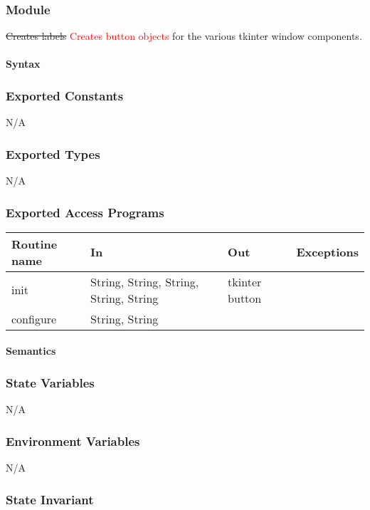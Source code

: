 \documentclass[12pt]{article}
\begin{document}
\subsubsection*{Module}

\sout{Creates labels} \textcolor{red}{Creates button objects} for the various tkinter window components.

\paragraph*{Syntax}

\subsubsection*{Exported Constants}
N/A
\subsubsection*{Exported Types}

N/A

\subsubsection* {Exported Access Programs}

\begin{tabular}{| l | l | l | l |}
\hline
\textbf{Routine name} & \textbf{In} & \textbf{Out} & \textbf{Exceptions}\\
\hline
init & String, String, String, String, String & tkinter button & \\
\hline
configure & String, String & & \\
\hline
\end{tabular}

\paragraph* {Semantics}

\subsubsection*{State Variables}

N/A

\subsubsection*{Environment Variables}

N/A

\subsubsection*{State Invariant}
\end{document}
